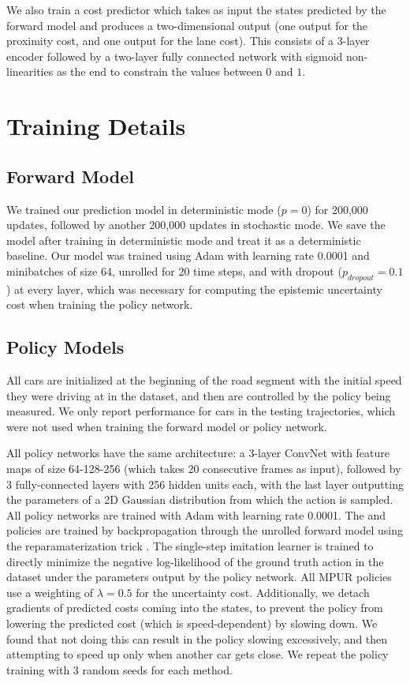 \documentclass{article} %
\begin{document}
We also train a cost predictor which takes as input the states predicted by the forward model and produces a two-dimensional output (one output for the proximity cost, and one output for the lane cost). 
This consists of a 3-layer encoder followed by a two-layer fully connected network with sigmoid non-linearities as the end to constrain the values between $0$ and $1$. 



    \section{Training Details}
    \label{training-details-appendix}

    \subsection{Forward Model}
    We trained our prediction model in deterministic mode ($p=0$) for 200,000 updates, followed by another 200,000 updates in stochastic mode.
    We save the model after training in deterministic mode and treat it as a deterministic baseline.
    Our model was trained using Adam \citep{ADAM} with learning rate 0.0001 and minibatches of size 64, unrolled for 20 time steps, and with dropout ($p_{dropout}=0.1$) at every layer, which was necessary for computing the epistemic uncertainty cost when training the policy network.

    \subsection{Policy Models}

    All cars are initialized at the beginning of the road segment with the initial speed they were driving at in the dataset, and then are controlled by the policy being measured. We only report performance for cars in the testing trajectories, which were not used when training the forward model or policy network. 
    

    
    All policy networks have the same architecture: a 3-layer ConvNet with feature maps of size 64-128-256 (which takes 20 consecutive frames as input), followed by 3 fully-connected layers with 256 hidden units each, with the last layer outputting the parameters of a 2D Gaussian distribution from which the action is sampled. All policy networks are trained with Adam with learning rate 0.0001. The \modelnameil and \modelnamedrop policies are trained by backpropagation through the unrolled forward model using the reparamaterization trick \citep{VAE}. The single-step imitation learner is trained to directly minimize the negative log-likelihood of the ground truth action in the dataset under the parameters output by the policy network. All MPUR policies use a weighting of $\lambda=0.5$ for the uncertainty cost. Additionally, we detach gradients of predicted costs coming into the states, to prevent the policy from lowering the predicted cost (which is speed-dependent) by slowing down. We found that not doing this can result in the policy slowing excessively, and then attempting to speed up only when another car gets close. We repeat the policy training with 3 random seeds for each method.
\end{document}

